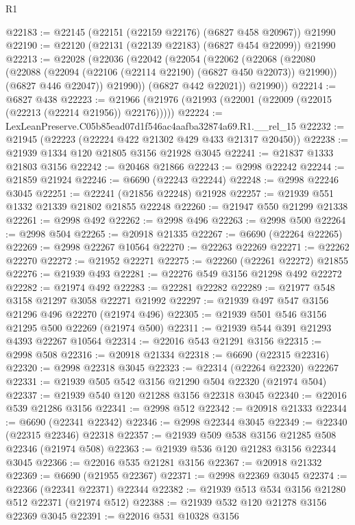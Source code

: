 \begin{lexlean}{R1}
\begin{coremodule}
@22183 := @22145 (@22151 (@22159 @22176) (@6827 @458 @20967)) @21990
@22190 := @22120 (@22131 (@22139 @22183) (@6827 @454 @22099)) @21990
@22213 := @22028
    (@22036
      (@22042
        (@22054
          (@22062
            (@22068
              (@22080
                (@22088 (@22094 (@22106 (@22114 @22190) (@6827 @450 @22073)) @21990))
                (@6827 @446 @22047))
              @21990))
          (@6827 @442 @22021))
        @21990))
@22214 := @6827 @438
@22223 := @21966 (@21976 (@21993 (@22001 (@22009 (@22015 (@22213 (@22214 @21956)) @22176)))))
@22224 := LexLeanPreserve.C05b85ead07d1f546ac4aafba32874a69.R1.__rel_15
@22232 := @21945 (@22223 (@22224 @422 @21302 @429 @433 @21317 @20450))
@22238 := @21939 @1334 @120 @21805 @3156 @21928 @3045
@22241 := @21837 @1333 @21803 @3156
@22242 := @20468 @21866
@22243 := @2998 @22242
@22244 := @21859 @21924
@22246 := @6690 (@22243 @22244)
@22248 := @2998 @22246 @3045
@22251 := @22241 (@21856 @22248) @21928
@22257 := @21939 @551 @1332 @21339 @21802 @21855 @22248
@22260 := @21947 @550 @21299 @21338
@22261 := @2998 @492
@22262 := @2998 @496
@22263 := @2998 @500
@22264 := @2998 @504
@22265 := @20918 @21335
@22267 := @6690 (@22264 @22265)
@22269 := @2998 @22267 @10564
@22270 := @22263 @22269
@22271 := @22262 @22270
@22272 := @21952 @22271
@22275 := @22260 (@22261 @22272) @21855
@22276 := @21939 @493
@22281 := @22276 @549 @3156 @21298 @492 @22272
@22282 := @21974 @492
@22283 := @22281 @22282
@22289 := @21977 @548 @3158 @21297 @3058 @22271 @21992
@22297 := @21939 @497 @547 @3156 @21296 @496 @22270 (@21974 @496)
@22305 := @21939 @501 @546 @3156 @21295 @500 @22269 (@21974 @500)
@22311 := @21939 @544 @391 @21293 @4393 @22267 @10564
@22314 := @22016 @543 @21291 @3156
@22315 := @2998 @508
@22316 := @20918 @21334
@22318 := @6690 (@22315 @22316)
@22320 := @2998 @22318 @3045
@22323 := @22314 (@22264 @22320) @22267
@22331 := @21939 @505 @542 @3156 @21290 @504 @22320 (@21974 @504)
@22337 := @21939 @540 @120 @21288 @3156 @22318 @3045
@22340 := @22016 @539 @21286 @3156
@22341 := @2998 @512
@22342 := @20918 @21333
@22344 := @6690 (@22341 @22342)
@22346 := @2998 @22344 @3045
@22349 := @22340 (@22315 @22346) @22318
@22357 := @21939 @509 @538 @3156 @21285 @508 @22346 (@21974 @508)
@22363 := @21939 @536 @120 @21283 @3156 @22344 @3045
@22366 := @22016 @535 @21281 @3156
@22367 := @20918 @21332
@22369 := @6690 (@21955 @22367)
@22371 := @2998 @22369 @3045
@22374 := @22366 (@22341 @22371) @22344
@22382 := @21939 @513 @534 @3156 @21280 @512 @22371 (@21974 @512)
@22388 := @21939 @532 @120 @21278 @3156 @22369 @3045
@22391 := @22016 @531 @10328 @3156

\end{coremodule}
\end{lexlean}
